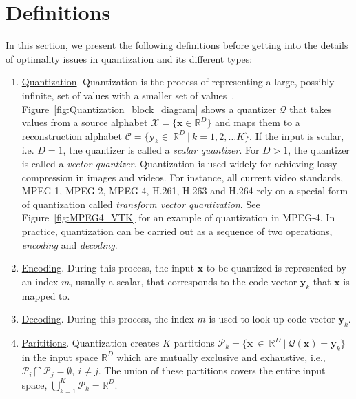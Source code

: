 \section{Definitions}
\label{sec:definitions}
In this section, we present the following definitions before getting into the details of optimality issues in quantization and its different types:

\begin{enumerate}
\item \underline{Quantization}.  Quantization is the process of representing a large, possibly infinite, set of values with a smaller set of values~\cite{2005_BOOK_DataCompression_Sayood}.  Figure~\ref{fig:Quantization_block_diagram} shows a quantizer $\mathcal{Q}$ that takes values from a source alphabet $\mathcal{X}=\{\mathbf{x} \in \mathbb{R}^D\}$ and maps them to a reconstruction alphabet $\mathcal{C}=\{\mathbf{y}_k \in \ \mathbb{R}^D \ | \ k=1,2, \ldots K\}$.  If the input is scalar, i.e. $D=1$, the quantizer is called a \emph{scalar quantizer}.  For $D>1$, the quantizer is called a \emph{vector quantizer}.  Quantization is used widely for achieving lossy compression in images and videos.  For instance, all current video standards, MPEG-1, MPEG-2, MPEG-4, H.261, H.263 and H.264 rely on a special form of quantization called \emph{transform vector quantization}.  See Figure~\ref{fig:MPEG4_VTK} for an example of quantization in MPEG-4.  In practice, quantization can be carried out as a sequence of two operations, \emph{encoding} and \emph{decoding}.

\item \underline{Encoding}.  During this process, the input $\mathbf{x}$ to be quantized is represented by an index $m$, usually a scalar, that corresponds to the code-vector $\mathbf{y}_k$ that $\mathbf{x}$ is mapped to.

\item \underline{Decoding}.  During this process, the index $m$ is used to look up code-vector $\mathbf{y}_k$.  

\item \underline{Parititions}.  Quantization creates $K$ partitions $\mathcal{P}_k = \{\mathbf{x} \ \in \ \mathbb{R}^D \ | \ \mathcal{Q}(\mathbf{x}) = \mathbf{y}_k\}$ in the input space $\mathbb{R}^D$ which are mutually exclusive and exhaustive, i.e., $\mathcal{P}_i \bigcap \mathcal{P}_j = \emptyset, \ i \neq j$.  The union of these partitions covers the entire input space, $\bigcup\limits_{k=1}^{K} \mathcal{P}_k=\mathbb{R}^D$.


\end{enumerate}
